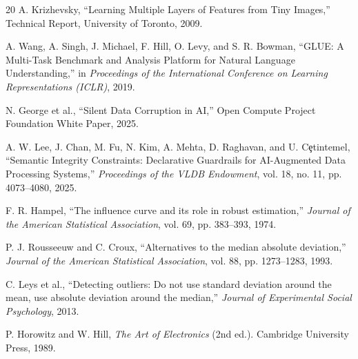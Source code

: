\documentclass[12pt,conference]{IEEEtran}
\begin{document}
\begin{thebibliography}{20}
A. Krizhevsky,
``Learning Multiple Layers of Features from Tiny Images,''
Technical Report, University of Toronto, 2009.

A. Wang, A. Singh, J. Michael, F. Hill, O. Levy, and S. R. Bowman,
``GLUE: A Multi-Task Benchmark and Analysis Platform for Natural Language Understanding,''
in \emph{Proceedings of the International Conference on Learning Representations (ICLR)}, 2019.

N. George et al.,
``Silent Data Corruption in AI,''
Open Compute Project Foundation White Paper, 2025.

A. W. Lee, J. Chan, M. Fu, N. Kim, A. Mehta, D. Raghavan, and U. C\c{e}tintemel,
``Semantic Integrity Constraints: Declarative Guardrails for AI-Augmented Data Processing Systems,''
\emph{Proceedings of the VLDB Endowment}, vol. 18, no. 11, pp. 4073--4080, 2025.

F. R. Hampel, ``The influence curve and its role in robust estimation,'' \emph{Journal of the American Statistical Association}, vol. 69, pp. 383--393, 1974.

P. J. Rousseeuw and C. Croux, ``Alternatives to the median absolute deviation,'' \emph{Journal of the American Statistical Association}, vol. 88, pp. 1273--1283, 1993.

C. Leys et al., ``Detecting outliers: Do not use standard deviation around the mean, use absolute deviation around the median,'' \emph{Journal of Experimental Social Psychology}, 2013.

P. Horowitz and W. Hill, \emph{The Art of Electronics} (2nd ed.). Cambridge University Press, 1989.

\end{thebibliography}
\end{document}
